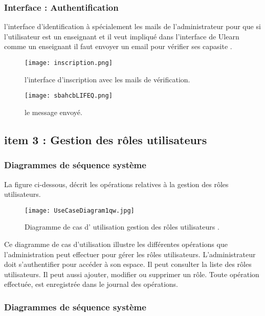 \clearpage

\subsubsection{ Interface : Authentification  }
l'interface d'identification à spécialement les mails de l'administrateur pour que si l'utilisateur est un enseignant  et il veut impliqué dans l'interface de Ulearn comme un enseignant il faut envoyer un email pour vérifier ses capasite .

\begin{figure}[ht]
	\centering
	\texttt{[image: inscription.png]}
	\caption{l'interface d'inscription avec les mails de vérification.}
	\label{fig:l'interface d'inscription avec les mails de vérification }
\end{figure}


\begin{figure}[ht]
	\centering
	\texttt{[image: sbahcbLIFEQ.png]}
	\caption{le message envoyé.}
	\label{fig:le message envoyé }
\end{figure}
\clearpage
\subsection{item 3 : Gestion des rôles utilisateurs}
\subsubsection{Diagrammes de séquence système }

La figure ci-dessous, décrit les opérations relatives à la gestion des rôles utilisateurs.
\begin{figure}[ht]
	\centering
	\texttt{[image: UseCaseDiagram1qw.jpg]}
	\caption{Diagramme de cas d' utilisation gestion des rôles utilisateurs .}
	\label{fig:Diagramme de cas d utilisation gestion des rôles utilisateurs }
\end{figure}
\FloatBarrier
Ce diagramme de cas d’utilisation illustre les différentes opérations que l’administration peut effectuer pour gérer les rôles utilisateurs. L’administrateur doit s’authentifier
pour accéder à son espace. Il peut consulter la liste des rôles utilisateurs. Il peut aussi
ajouter, modifier ou supprimer un rôle. Toute opération effectuée, est enregistrée dans le
journal des opérations.
\clearpage
\subsubsection{Diagrammes de séquence système }



